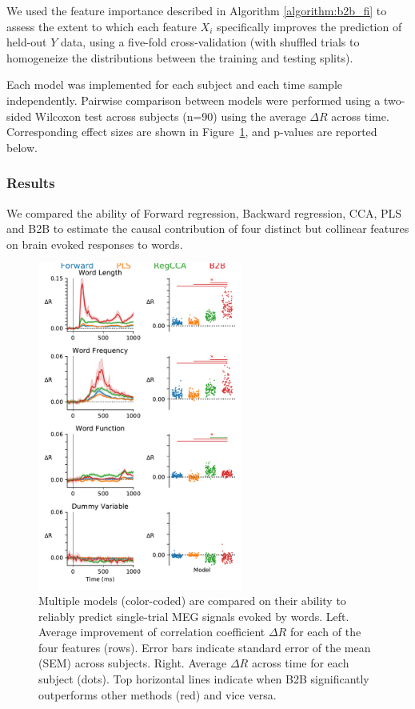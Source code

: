 We used the feature importance described in Algorithm \ref{algorithm:b2b_fi} to
assess the extent to which each feature $X_i$ specifically improves the
prediction of held-out $Y$ data, using a five-fold cross-validation (with shuffled
trials to homogeneize the distributions between the training and testing
splits).

Each model was implemented for each subject and each time sample independently.
Pairwise comparison between models were performed using a two-sided Wilcoxon
test across subjects (n=90) using the average $\Delta R$ across time.
Corresponding effect sizes are shown in Figure~\ref{fig:meg_results}, and
p-values are reported below.


\subsubsection{Results}
We compared the ability of Forward regression, Backward regression, CCA, PLS and
B2B to estimate the causal contribution of four distinct but collinear features
on brain evoked responses to words.

\begin{figure}
  \begin{center}
    \includegraphics[width=0.6\textwidth, trim=0cm 0cm 0cm 0cm, clip=True]{figures/meg.pdf}
  \end{center}
  \caption{Multiple models (color-coded) are compared on their ability to
  reliably predict single-trial MEG signals evoked by words. Left. Average
  improvement of correlation coefficient $\Delta R$ for each of the four
  features (rows). Error bars indicate standard error of the mean (SEM) across
  subjects. Right. Average $\Delta R$ across time for each subject (dots). Top
  horizontal lines indicate when B2B significantly outperforms other methods
  (red) and vice versa. \label{fig:meg_results}
}
\end{figure}

